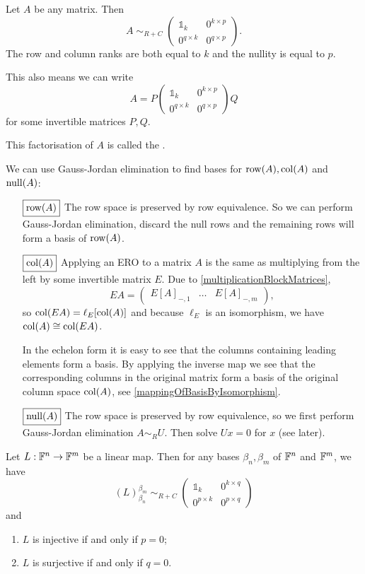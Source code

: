 \begin{corollary}
Let $A$ be any matrix. Then
\[ A \;\sim_{R+C}\; \begin{pmatrix}
\mathbb{1}_k & 0^{k\times p} \\
0^{q\times k} & 0^{q\times p}
\end{pmatrix}. \]
The row and column ranks are both equal to $k$ and the nullity is equal to $p$.

This also means we can write
\[ A = P\begin{pmatrix}
\mathbb{1}_k & 0^{k\times p} \\
0^{q\times k} & 0^{q\times p}
\end{pmatrix}Q \]
for some invertible matrices $P,Q$.
\end{corollary}
This factorisation of $A$ is called the .


We can use Gauss-Jordan elimination to find bases for $\operatorname{row}(A), \operatorname{col}(A)$ and $\operatorname{null}(A)$:
\begin{itemize}
\item[$\boxed{\operatorname{row}(A)}$] The row space is preserved by row equivalence. So we can perform Gauss-Jordan elimination, discard the null rows and the remaining rows will form a basis of $\operatorname{row}(A)$.
\item[$\boxed{\operatorname{col}(A)}$] Applying an ERO to a matrix $A$ is the same as multiplying from the left by some invertible matrix $E$. Due to \ref{multiplicationBlockMatrices},
\[ EA = \begin{pmatrix}
E[A]_{-,1} & \hdots & E[A]_{-,m}
\end{pmatrix}, \]
so $\operatorname{col}(EA) = \ell_E[\operatorname{col}(A)]$ and because $\ell_E$ is an isomorphism, we have $\operatorname{col}(A) \cong \operatorname{col}(EA)$.

In the echelon form it is easy to see that the columns containing leading elements form a basis. By applying the inverse map we see that the corresponding columns in the original matrix form a basis of the original column space $\operatorname{col}(A)$, see \ref{mappingOfBasisByIsomorphism}.
\item[$\boxed{\operatorname{null}(A)}$] The row space is preserved by row equivalence, so we first perform Gauss-Jordan elimination $A\sim_R U$. Then solve $Ux=0$ for $x$ (see later).
\end{itemize}

\begin{proposition}
Let $L:\mathbb{F}^n\to\mathbb{F}^m$ be a linear map. Then for any bases $\beta_n,\beta_m$ of $\mathbb{F}^n$ and $\mathbb{F}^m$, we have
\[ (L)_{\beta_n}^{\beta_m} \;\sim_{R+C}\; \begin{pmatrix}
\mathbb{1}_k & 0^{k\times q} \\
0^{p\times k} & 0^{p\times q}
\end{pmatrix} \]
and
\begin{enumerate}
\item $L$ is injective \textup{if and only if} $p=0$;
\item $L$ is surjective \textup{if and only if} $q=0$.
\end{enumerate}
\end{proposition}


